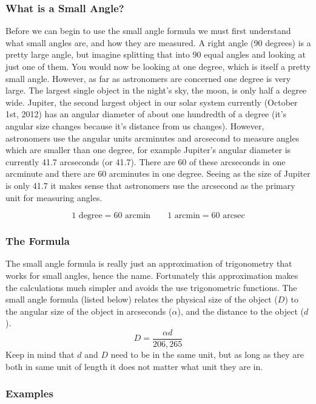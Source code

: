 \subsubsection*{What is a Small Angle?}
Before we can begin to use the small angle formula we must first understand what small angles are, and how they are measured.
A right angle (90 degrees) is a pretty large angle, but imagine splitting that into 90 equal angles and looking at just one of them.
You would now be looking at one degree, which is itself a pretty small angle.
However, as far as astronomers are concerned one degree is very large.
The largest single object in the night's sky, the moon, is only half a degree wide.
Jupiter, the second largest object in our solar system currently (October 1st, 2012) has an angular diameter of about one hundredth of a degree (it's angular size changes because it's distance from us changes).
However, astronomers use the angular units arcminutes and arcsecond to measure angles which are smaller than one degree, for example Jupiter's angular diameter is currently 41.7 arcseconds (or 41.7\arcsec).
There are 60 of these arcseconds in one arcminute and there are 60 arcminutes in one degree. 
Seeing as the size of Jupiter is only {41.7\arcsec} it makes sense that astronomers use the arcsecond as the primary unit for measuring angles.

$$ 1 \text{ degree} = 60 \text{ arcmin} \qquad 1 \text{ arcmin} = 60 \text{ arcsec}$$

\subsubsection*{The Formula}

The small angle formula is really just an approximation of trigonometry that works for small angles, hence the name.
Fortunately this approximation makes the calculations much simpler and avoids the use trigonometric functions. The small angle formula (listed below) relates the physical size of the object ($D$) to the angular size of the object in arcseconds ($\alpha$), and the distance to the object ($d$).
\begin{equation} \label{eqn:small_angle}
D=\frac{\alpha d}{206,265}
\end{equation}
Keep in mind that $d$ and $D$ need to be in the same unit, but as long as they are both in same unit of length it does not matter what unit they are in.

\subsubsection*{Examples}

